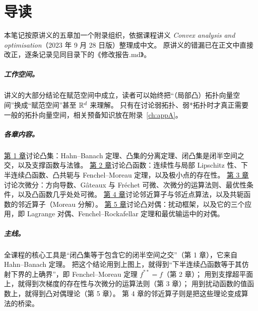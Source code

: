 \chapter{导读}

本笔记按原讲义的五章加一个附录组织，依据课程讲义 \emph{Convex analysis and optimisation}（2023 年 9 月 28 日版）整理成中文。
原讲义的错漏已在正文中直接改正，逐条记录见同目录下的《修改报告.md》。

\paragraph{工作空间。}
讲义的大部分结论在赋范空间中成立，读者可以始终把“（局部凸）拓扑向量空间”换成“赋范空间”甚至 $\mathbb{R}^d$ 来理解。
只有在讨论弱拓扑、弱*拓扑时才真正需要一般的拓扑向量空间，相关预备知识放在附录~\ref{ch:appA}。

\paragraph{各章内容。}
\hyperref[ch:ch01]{第 1 章}讨论凸集：Hahn--Banach 定理、凸集的分离定理、闭凸集是闭半空间之交，以及支撑函数与法锥。
\hyperref[ch:ch02]{第 2 章}讨论凸函数：连续性与局部 Lipschitz 性、下半连续凸函数、凸共轭与 Fenchel--Moreau 定理，以及极小点的存在性。
\hyperref[ch:ch03]{第 3 章}讨论次微分：方向导数、Gâteaux 与 Fréchet 可微、次微分的运算法则、最优性条件，以及凸函数几乎处处可微。
\hyperref[ch:ch04]{第 4 章}讨论邻近算子与邻近点算法，以及共轭函数的邻近算子（Moreau 分解）。
\hyperref[ch:ch05]{第 5 章}讨论凸对偶：扰动框架，以及它的三个应用，即 Lagrange 对偶、Fenchel--Rockafellar 定理和最优输运中的对偶。

\paragraph{主线。}
全课程的核心工具是“闭凸集等于包含它的闭半空间之交”（第 1 章），它来自 Hahn--Banach 定理。
把这个结论用到上图上，就得到“下半连续凸函数等于其仿射下界的上确界”，即 Fenchel--Moreau 定理 $f^{**}=f$（第 2 章）；
用到支撑超平面上，就得到次梯度的存在性与次微分的运算法则（第 3 章）；
用到扰动函数的值函数上，就得到凸对偶理论（第 5 章）。
第 4 章的邻近算子则是把这些理论变成算法的桥梁。
